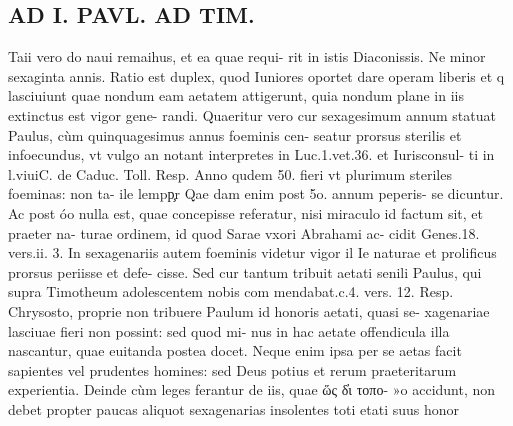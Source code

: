 \documentclass{article}
\begin{document}
\begin{pages}
\section*{AD I. PAVL. AD TIM. }
\marginpar{[ p.274 ]}\pstart Taii vero do naui remaihus, et ea quae requi- rit in istis Diaconissis.  \pend\pstart Ne minor sexaginta annis. Ratio est duplex, quod Iuniores oportet dare operam liberis et q lasciuiunt quae nondum eam aetatem attigerunt, quia nondum plane in iis extinctus est vigor gene- randi. Quaeritur vero cur sexagesimum annum statuat Paulus, cùm quinquagesimus annus foeminis cen- seatur prorsus sterilis et infoecundus, vt vulgo an notant interpretes in Luc.1.vet.36. et Iurisconsul- ti in l.viuiC. de Caduc. Toll. Resp. Anno qudem 50. fieri vt plurimum steriles foeminas: non ta- ile lempp̧r Qae dam enim post 5o. annum peperis- se dicuntur. Ac post óo nulla est, quae concepisse referatur, nisi miraculo id factum sit, et praeter na- turae ordinem, id quod Sarae vxori Abrahami ac- cidit Genes.18. vers.ii. 3.  \pend\pstart In sexagenariis autem foeminis videtur vigor il Ie naturae et prolificus prorsus periisse et defe- cisse.  \pend\pstart Sed cur tantum tribuit aetati senili Paulus, qui supra Timotheum adolescentem nobis com mendabat.c.4. vers. 12. Resp. Chrysosto, proprie non tribuere Paulum id honoris aetati, quasi se- xagenariae lasciuae fieri non possint: sed quod mi- nus in hac aetate offendicula illa nascantur, quae euitanda postea docet. Neque enim ipsa per se aetas facit sapientes vel prudentes homines: sed Deus potius et rerum praeteritarum experientia. Deinde cùm leges ferantur de iis, quae ὥς δ̓ι τοπο- »o accidunt, non debet propter paucas aliquot sexagenarias insolentes toti etati suus honor  \pend

\end{pages}
\end{document}
